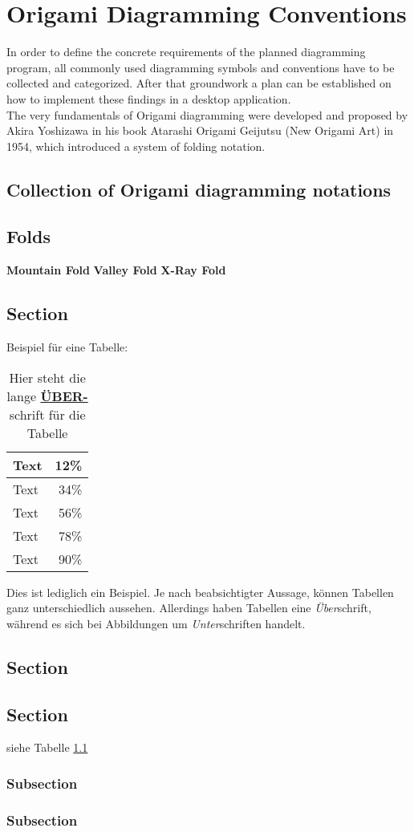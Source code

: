 \chapter{Origami Diagramming Conventions}

In order to define the concrete requirements of the planned diagramming program, all commonly used diagramming symbols and conventions have to be collected and categorized. After that groundwork a plan can be established on how to implement these findings in a desktop application.\\

The very fundamentals of Origami diagramming were developed and proposed by Akira Yoshizawa in his book Atarashi Origami Geijutsu (New Origami Art)\cite{Yoshizawa} in 1954, which introduced a system of folding notation.

\section{Collection of Origami diagramming notations}


\section{Folds}

\textbf{Mountain Fold}
\textbf{Valley Fold}
\textbf{X-Ray Fold}


\section{Section}
Beispiel für eine Tabelle:
\begin{table}[ht]
	\centering
	\caption[Kurztitel Tabelle]{Hier steht die lange \underline{\textbf{ÜBER-}}schrift für die Tabelle}

		\vspace{1.0em}
		\begin{tabular}{|l|r|}
\hline
Text & 12\% \\
\hline
Text & 34\% \\
\hline
Text & 56\% \\
\hline
Text & 78\% \\
\hline
Text & 90\% \\
\hline
		\end{tabular}
	\label{tab:tabelle}
\end{table}


\noindent{}Dies ist lediglich ein Beispiel. Je nach beabsichtigter Aussage, können Tabellen ganz unterschiedlich aussehen. Allerdings haben Tabellen eine \emph{Über}schrift, während es sich bei Abbildungen um \emph{Unter}schriften handelt.

\section{Section}

\section{Section}
siehe Tabelle \ref{tab:tabelle}

\subsection{Subsection}

\subsection{Subsection}
